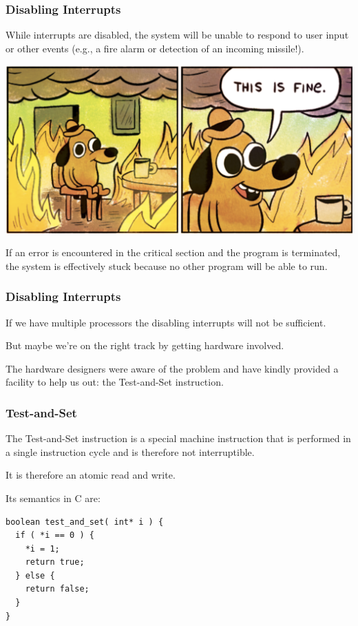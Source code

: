 \begin{frame}
\frametitle{Disabling Interrupts}

While interrupts are disabled, the system will be unable to respond to user input or other events (e.g., a fire alarm or detection of an incoming missile!). 

\begin{center}
	\includegraphics[width=\textwidth]{images/thisisfine.png}
\end{center}

If an error is encountered in the critical section and the program is terminated, the system is effectively stuck because no other program will be able to run.


\end{frame}

\begin{frame}
\frametitle{Disabling Interrupts}

If we have multiple processors the disabling interrupts will not be sufficient. 

But maybe we're on the right track by getting hardware involved.


The hardware designers were aware of the problem and have kindly provided a facility to help us out: the \alert{Test-and-Set} instruction. 


\end{frame}

\begin{frame}[fragile]
\frametitle{Test-and-Set}

The Test-and-Set instruction is a special machine instruction that is performed in a single instruction cycle and is therefore not interruptible. 

It is therefore an atomic read and write. 

Its semantics in C are:

\begin{verbatim}
boolean test_and_set( int* i ) {
  if ( *i == 0 ) {
    *i = 1;
    return true;
  } else {
    return false;
  }
}
\end{verbatim}

\end{frame}

